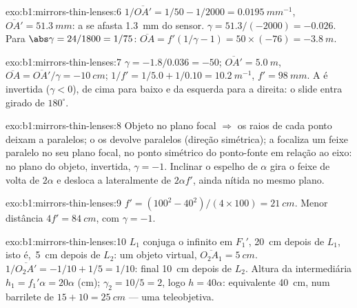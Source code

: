 \begin{solution}{exo:b1:mirrors-thin-lenses:6}
$1/\overline{OA'} = 1/50 - 1/2000 = \qty{0.0195}{mm^{-1}}$,
$\overline{OA'} = \qty{51.3}{mm}$: a  se afasta \qty{1.3}{mm} do
sensor. $\gamma = 51.3/(-2000) = -0.026$. Para $\abs\gamma = 24/1800
= 1/75$: $\overline{OA} = f'(1/\gamma - 1) = 50 \times (-76) =
\qty{-3.8}{m}$.
\end{solution}

\begin{solution}{exo:b1:mirrors-thin-lenses:7}
$\gamma = -1.8/0.036 = -50$; $\overline{OA'} = \qty{5.0}{m}$,
$\overline{OA} = \overline{OA'}/\gamma = \qty{-10}{cm}$;
$1/f' = 1/5.0 + 1/0.10 = \qty{10.2}{m^{-1}}$, $f' = \qty{98}{mm}$. A
 é invertida ($\gamma < 0$), de cima para baixo e da esquerda para a direita: o slide
entra girado de $180^\circ$.
\end{solution}

\begin{solution}{exo:b1:mirrors-thin-lenses:8}
Objeto no plano focal $\Rightarrow$ os raios de cada ponto deixam a
 paralelos; o  os devolve paralelos (direção
simétrica); a  focaliza um feixe paralelo no seu plano focal, no
ponto simétrico do ponto-fonte em relação ao eixo:  no plano do
objeto, invertida, $\gamma = -1$. Inclinar o espelho de $\alpha$ gira o
feixe de volta de $2\alpha$ e desloca a  lateralmente de
$2\alpha f'$, ainda nítida no mesmo plano.
\end{solution}

\begin{solution}{exo:b1:mirrors-thin-lenses:9}
$f' = (100^2 - 40^2)/(4 \times 100) = \qty{21}{cm}$. Menor distância
$4f' = \qty{84}{cm}$, com $\gamma = -1$.
\end{solution}

\begin{solution}{exo:b1:mirrors-thin-lenses:10}
$L_1$ conjuga o infinito em $F_1'$, \qty{20}{cm} depois de $L_1$, isto é,\ \qty{5}{cm}
depois de $L_2$: um objeto virtual, $\overline{O_2A_1} = \qty{+5}{cm}$.
$1/\overline{O_2A'} = -1/10 + 1/5 = 1/10$:  final \qty{10}{cm}
depois de $L_2$. Altura da  intermediária $h_1 = f_1'\alpha = 20\alpha$ (cm);
$\gamma_2 = 10/5 = 2$, logo $h = 40\alpha$:  equivalente
\qty{40}{cm}, num barrilete de $15 + 10 = \qty{25}{cm}$ --- uma teleobjetiva.
\end{solution}

